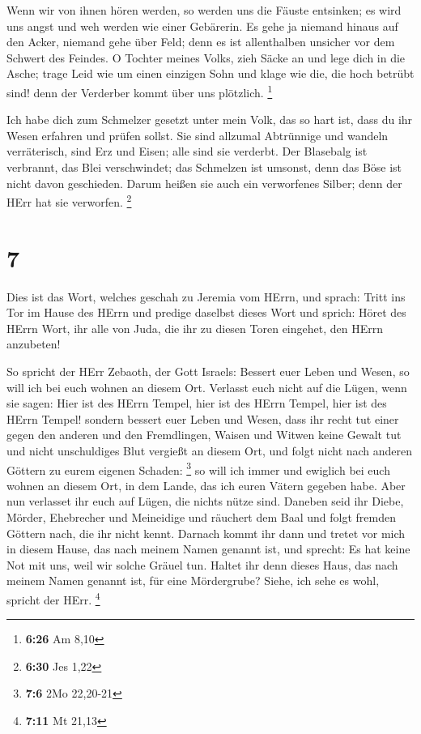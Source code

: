  Wenn wir von ihnen hören werden, so werden uns die Fäuste
entsinken; es wird uns angst und weh werden wie einer Gebärerin.
 Es gehe ja niemand hinaus auf den Acker, niemand gehe über
Feld; denn es ist allenthalben unsicher vor dem Schwert des Feindes.
 O Tochter meines Volks, zieh Säcke an und lege dich in die
Asche; trage Leid wie um einen einzigen Sohn und klage wie die, die hoch
betrübt sind! denn der Verderber kommt über uns plötzlich. \footnote{\textbf{6:26}
  Am 8,10}

 Ich habe dich zum Schmelzer gesetzt unter mein Volk, das
so hart ist, dass du ihr Wesen erfahren und prüfen sollst. 
Sie sind allzumal Abtrünnige und wandeln verräterisch, sind Erz und
Eisen; alle sind sie verderbt.  Der Blasebalg ist
verbrannt, das Blei verschwindet; das Schmelzen ist umsonst, denn das
Böse ist nicht davon geschieden.  Darum heißen sie auch ein
verworfenes Silber; denn der HErr hat sie verworfen. \footnote{\textbf{6:30}
  Jes 1,22}

\hypertarget{section-1}{%
\section{7}\label{section-1}}

 Dies ist das Wort, welches geschah zu Jeremia vom HErrn,
und sprach:  Tritt ins Tor im Hause des HErrn und predige
daselbst dieses Wort und sprich: Höret des HErrn Wort, ihr alle von
Juda, die ihr zu diesen Toren eingehet, den HErrn anzubeten!

 So spricht der HErr Zebaoth, der Gott Israels: Bessert euer
Leben und Wesen, so will ich bei euch wohnen an diesem Ort. 
Verlasst euch nicht auf die Lügen, wenn sie sagen: Hier ist des HErrn
Tempel, hier ist des HErrn Tempel, hier ist des HErrn Tempel!
 sondern bessert euer Leben und Wesen, dass ihr recht tut
einer gegen den anderen  und den Fremdlingen, Waisen und
Witwen keine Gewalt tut und nicht unschuldiges Blut vergießt an diesem
Ort, und folgt nicht nach anderen Göttern zu eurem eigenen Schaden:
\footnote{\textbf{7:6} 2Mo 22,20-21}  so will ich immer und
ewiglich bei euch wohnen an diesem Ort, in dem Lande, das ich euren
Vätern gegeben habe.  Aber nun verlasset ihr euch auf Lügen,
die nichts nütze sind.  Daneben seid ihr Diebe, Mörder,
Ehebrecher und Meineidige und räuchert dem Baal und folgt fremden
Göttern nach, die ihr nicht kennt.  Darnach kommt ihr dann
und tretet vor mich in diesem Hause, das nach meinem Namen genannt ist,
und sprecht: Es hat keine Not mit uns, weil wir solche Gräuel tun.
 Haltet ihr denn dieses Haus, das nach meinem Namen genannt
ist, für eine Mördergrube? Siehe, ich sehe es wohl, spricht der HErr.
\footnote{\textbf{7:11} Mt 21,13}

